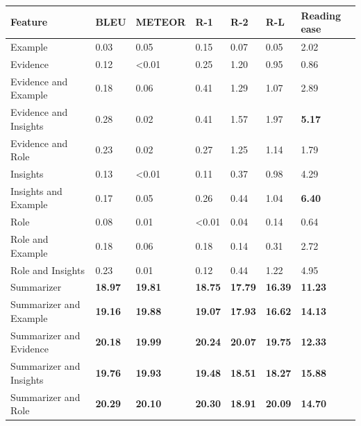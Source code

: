 \begin{tabular}{|l|l|l|l|l|l|l|}
\hline
\textbf{Feature} & BLEU & METEOR & R-1 & R-2 & R-L & Reading ease \\
 \hline
 Example & 0.03 & 0.05 & 0.15 & 0.07 & 0.05 & 2.02 \\
 \hline
 Evidence & 0.12 & \textless{}0.01 & 0.25 & 1.20 & 0.95 & 0.86 \\
 \hline
 Evidence and Example & 0.18 & 0.06 & 0.41 & 1.29 & 1.07 & 2.89 \\
 \hline
 Evidence and Insights & 0.28 & 0.02 & 0.41 & 1.57 & 1.97 & \textbf{5.17} \\
 \hline
 Evidence and Role & 0.23 & 0.02 & 0.27 & 1.25 & 1.14 & 1.79 \\
 \hline
 Insights & 0.13 & \textless{}0.01 & 0.11 & 0.37 & 0.98 & 4.29 \\
 \hline
 Insights and Example & 0.17 & 0.05 & 0.26 & 0.44 & 1.04 & \textbf{6.40} \\
 \hline
 Role & 0.08 & 0.01 & \textless{}0.01 & 0.04 & 0.14 & 0.64 \\
 \hline
 Role and Example & 0.18 & 0.06 & 0.18 & 0.14 & 0.31 & 2.72 \\
 \hline
 Role and Insights & 0.23 & 0.01 & 0.12 & 0.44 & 1.22 & 4.95 \\
 \hline
 Summarizer & \textbf{18.97} & \textbf{19.81} & \textbf{18.75} & \textbf{17.79} & \textbf{16.39} & \textbf{11.23} \\
 \hline
 Summarizer and Example & \textbf{19.16} & \textbf{19.88} & \textbf{19.07} & \textbf{17.93} & \textbf{16.62} & \textbf{14.13} \\
 \hline
 Summarizer and Evidence & \textbf{20.18} & \textbf{19.99} & \textbf{20.24} & \textbf{20.07} & \textbf{19.75} & \textbf{12.33} \\
 \hline
 Summarizer and Insights & \textbf{19.76} & \textbf{19.93} & \textbf{19.48} & \textbf{18.51} & \textbf{18.27} & \textbf{15.88} \\
 \hline
 Summarizer and Role & \textbf{20.29} & \textbf{20.10} & \textbf{20.30} & \textbf{18.91} & \textbf{20.09} & \textbf{14.70} \\
\hline
\end{tabular}
